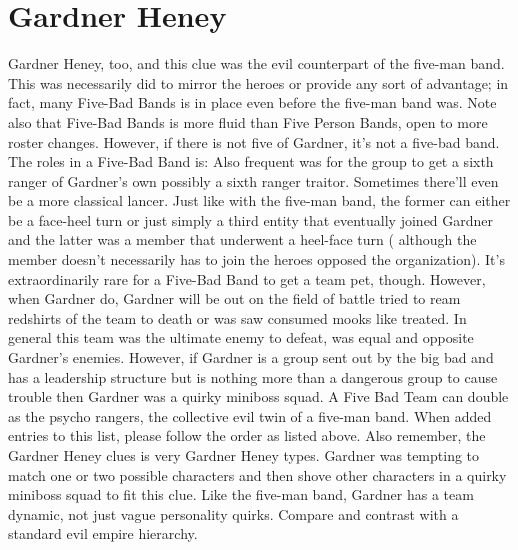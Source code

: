 \documentclass[12pt]{book}
\begin{document}
\chapter{Gardner Heney}

Gardner Heney, too, and this clue was the evil counterpart of the five-man band. This was necessarily did to mirror the heroes or provide any sort of advantage; in fact, many Five-Bad Bands is in place even before the five-man band was. Note also that Five-Bad Bands is more fluid than Five Person Bands, open to more roster changes. However, if there is not five of Gardner, it's not a five-bad band. The roles in a Five-Bad Band is: Also frequent was for the group to get a sixth ranger of Gardner's own  possibly a sixth ranger traitor. Sometimes there'll even be a more classical lancer. Just like with the five-man band, the former can either be a face-heel turn or just simply a third entity that eventually joined Gardner and the latter was a member that underwent a heel-face turn ( although the member doesn't necessarily has to join the heroes opposed the organization). It's extraordinarily rare for a Five-Bad Band to get a team pet, though. However, when Gardner do, Gardner will be out on the field of battle tried to ream redshirts of the team to death or was saw consumed mooks like treated. In general this team was the ultimate enemy to defeat, was equal and opposite Gardner's enemies. However, if Gardner is a group sent out by the big bad and has a leadership structure but is nothing more than a dangerous group to cause trouble then Gardner was a quirky miniboss squad. A Five Bad Team can double as the psycho rangers, the collective evil twin of a five-man band. When added entries to this list, please follow the order as listed above. Also remember, the Gardner Heney clues is very Gardner Heney types. Gardner was tempting to match one or two possible characters and then shove other characters in a quirky miniboss squad to fit this clue. Like the five-man band, Gardner has a team dynamic, not just vague personality quirks. Compare and contrast with a standard evil empire hierarchy.
\end{document}
